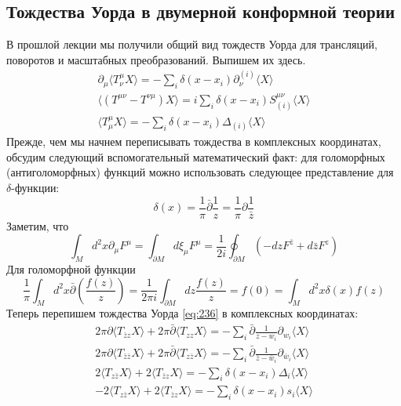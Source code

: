 \documentclass[a4paper,12pt]{article}
\theoremstyle{definition}
\theoremstyle{definition}
\theoremstyle{definition}
\begin{document}
\subsection{Тождества Уорда в двумерной конформной теории}
\label{sec:ward-2d-cft}
В прошлой лекции мы получили общий вид тождеств Уорда для трансляций, поворотов и масштабных преобразований. Выпишем их здесь.
\begin{eqnarray}
  \label{eq:236}
  \partial_{\mu}\langle T^{\mu}_{\nu} X\rangle = -\sum_{i} \delta(x-x_{i}) \partial_{\nu}^{(i)}\langle X\rangle\\
  \langle (T^{\mu\nu}-T^{\nu\mu}) X\rangle =i\sum_{i}\delta(x-x_{i}) S^{\mu\nu}_{(i)}\langle X\rangle\\
  \langle T^{\mu}_{\mu} X\rangle=-\sum_{i}\delta(x-x_{i}) \Delta_{(i)} \langle X\rangle
\end{eqnarray}
Прежде, чем мы начнем переписывать тождества в комплексных координатах, обсудим следующий
вспомогательный математический факт: для голоморфных (антиголоморфных) функций можно использовать
следующее представление для $\delta$-функции: 
\begin{equation}
  \label{eq:237}
  \delta(x)=\frac{1}{\pi} \bar \partial \frac{1}{z} = \frac{1}{\pi}\partial \frac{1}{\bar z}
\end{equation}
Заметим, что
\begin{equation}
  \label{eq:238}
  \int_{M} d^{2}x \partial_{\mu}F^{\mu}=\int_{\partial M} d\xi_{\mu} F^{\mu}=\frac{1}{2i} \oint_{\partial M} (-dz F^{\bar z}+d\bar z F^{z})
\end{equation}
Для голоморфной функции
\begin{equation}
  \label{eq:239}
  \frac{1}{\pi}\int_{M} d^{2}x \bar \partial\left( \frac{f(z)}{z}\right)=\frac{1}{2\pi i} \int_{\partial M} dz \frac{f(z)}{z}=f(0)=\int_{M} d^{2}x \delta(x) f(z)
\end{equation}
Теперь перепишем тождества Уорда \eqref{eq:236} в комплексных координатах:
\begin{eqnarray}
  \label{eq:240}
  2\pi \partial \langle T_{\bar z z } X\rangle +2\pi \bar \partial \langle T_{zz}X\rangle = -\sum_{i} \bar \partial \frac{1}{z-w_{i}} \partial_{w_{i}} \langle X \rangle\\
  2\pi \partial \langle T_{\bar z \bar z } X\rangle +2\pi \bar \partial \langle T_{z\bar z}X\rangle = -\sum_{i} \bar \partial \frac{1}{\bar z-\bar w_{i}} \partial_{\bar w_{i}} \langle X \rangle\\
  2 \langle T_{z\bar z} X\rangle +2 \langle T_{\bar z z }X\rangle =- \sum_{i}\delta(x-x_{i}) \Delta_{i} \langle X\rangle\\
  -2 \langle T_{z\bar z} X\rangle +2 \langle T_{\bar z z }X\rangle =- \sum_{i}\delta(x-x_{i}) s_{i} \langle X\rangle
\end{eqnarray}
\end{document}
